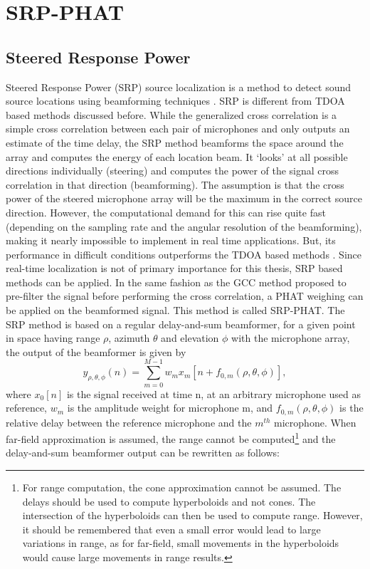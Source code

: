 \section{SRP-PHAT}
\subsection{Steered Response Power}
Steered Response Power (SRP) source localization is a method to detect sound source locations using beamforming techniques \cite{krim1996two}. SRP is different from TDOA based methods discussed before. While the generalized cross correlation is a simple cross correlation between each pair of microphones and only outputs an estimate of the time delay, the SRP method beamforms the space around the array and computes the energy of each location beam.  It `looks' at all possible directions individually (steering) and computes the power of the signal cross correlation in that direction (beamforming). The assumption is that the cross power of the steered microphone array will be the maximum in the correct source direction. However, the computational demand for this can rise quite fast (depending on the sampling rate and the angular resolution of the beamforming), making it nearly impossible to implement in real time applications. But, its performance in difficult conditions outperforms the TDOA based methods \cite{dmochowski2007generalized}. Since real-time localization is not of primary importance for this thesis, SRP based methods can be applied. In the same fashion as the GCC method proposed to pre-filter the signal before performing the cross correlation, a PHAT weighing can be applied on the beamformed signal. This method is called SRP-PHAT. %
The SRP method is based on a regular delay-and-sum beamformer, for a given point in space having range $\rho$, azimuth $\theta$ and elevation $\phi$ with the microphone array, the output of the beamformer is given by
\begin{equation}
    y_{\rho,\theta,\phi}(n)=\sum\limits_{m=0}^{M-1}{w_m x_m[n + f_{0,m}(\rho,\theta,\phi)]},
\end{equation}
where $x_0[n]$ is the signal received at time n, at an arbitrary microphone used as reference, $w_m$ is the amplitude weight for microphone m, and $f_{0,m}(\rho,\theta,\phi)$ is the relative delay between the reference microphone and the $m^{th}$ microphone. When far-field approximation is assumed, the range cannot be computed\footnote{For range computation, the cone approximation cannot be assumed. The delays should be used to compute hyperboloids and not cones. The intersection of the hyperboloids can then be used to compute range. However, it should be remembered that even a small error would lead to large variations in range, as for far-field, small movements in the hyperboloids would cause large movements in range results.} and the delay-and-sum beamformer output can be rewritten as follows:
